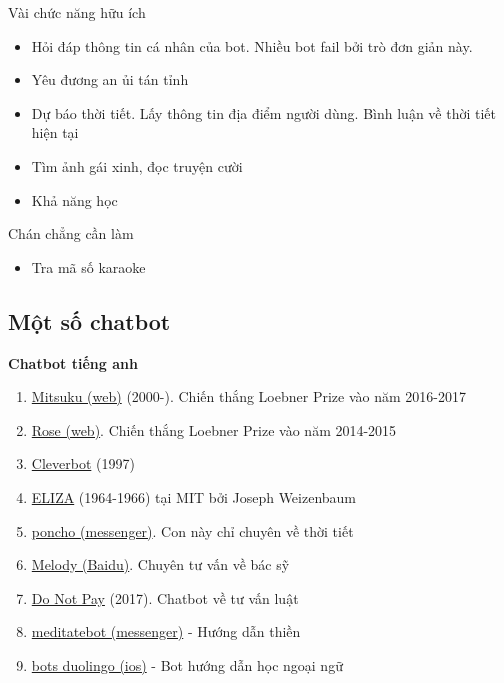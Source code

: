 Vài chức năng hữu ích

\begin{itemize}
  \item Hỏi đáp thông tin cá nhân của bot. Nhiều bot fail bởi trò đơn giản này.
  \item Yêu đương an ủi tán tỉnh
  \item Dự báo thời tiết. Lấy thông tin địa điểm người dùng. Bình luận về thời tiết hiện tại
  \item Tìm ảnh gái xinh, đọc truyện cười
  \item Khả năng học
\end{itemize}

Chán chẳng cần làm

\begin{itemize}
  \item Tra mã số karaoke
\end{itemize}

\subsection{Một số chatbot}

\textbf{Chatbot tiếng anh}

\begin{enumerate}
  \item \href{http://www.mitsuku.com/}{Mitsuku (web)} (2000-). Chiến thắng Loebner Prize vào năm 2016-2017
  \item  \href{http://ec2-54-215-197-164.us-west-1.compute.amazonaws.com/speech.php}{Rose (web)}. Chiến thắng Loebner Prize vào năm 2014-2015
  \item \href{http://www.cleverbot.com/ (web)}{Cleverbot} (1997)
  \item \href{https://en.wikipedia.org/wiki/ELIZA}{ELIZA} (1964-1966) tại MIT bởi Joseph Weizenbaum
  \item \href{https://poncho.is/}{poncho (messenger)}. Con này chỉ chuyên về thời tiết
  \item \href{http://research.baidu.com/baidus-melody-ai-powered-conversational-bot-doctors-patients/}{Melody (Baidu)}. Chuyên tư vấn về bác sỹ
   \item \href{https://donotpay-search-master.herokuapp.com/}{Do Not Pay} (2017). Chatbot về tư vấn luật
  \item \href{https://www.messenger.com/t/MeditateBot}{meditatebot (messenger)}  - Hướng dẫn thiền
  \item \href{http://bots.duolingo.com/}{bots duolingo (ios)}  - Bot hướng dẫn học ngoại ngữ
\end{enumerate}

